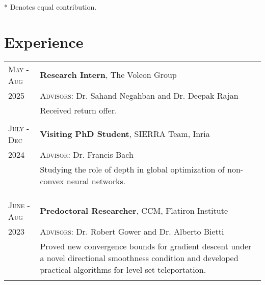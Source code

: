 \documentclass[10pt]{article}
\newcommand{\spacing}{\vspace{0.5cm}}
\begin{document}
* Denotes equal contribution.

\spacing

\section{Experience}
\begin{longtable}
    {R{1.8cm}|L{11.8cm}}
    \textsc{May - Aug} & \textbf{Research Intern}, The Voleon Group                                                  \\
    2025                &  \textsc{Advisors:} Dr. Sahand Negahban and Dr. Deepak Rajan                                                                                                            \\                  & {\small Received return offer.}                                                                                          \\  \\
    \textsc{July - Dec} & \textbf{Visiting PhD Student}, SIERRA Team, Inria                                                  \\
    2024                & \textsc{Advisor:}
    Dr.
    Francis Bach                                                                                                             \\                  & {\small Studying the role of depth in global optimization
    of non-convex neural networks.}                                                                                          \\ \\ \\ \\
    \textsc{June - Aug} & \textbf{Predoctoral Researcher}, CCM, Flatiron Institute                                           \\
    2023                & \textsc{Advisors:}
    Dr.
    Robert Gower and Dr.
    Alberto Bietti                                                                                                           \\                  & {\small Proved new convergence bounds for gradient descent
                               under a novel directional smoothness condition and developed practical
                               algorithms for level set teleportation.
    }                                                                                                                        \\  \\

\end{longtable}
\end{document}
